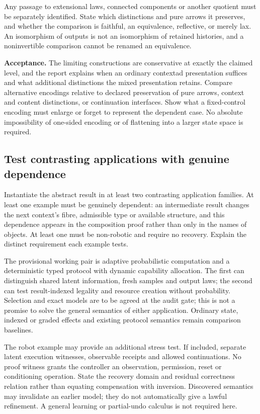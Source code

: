 \documentclass[11pt,a4paper]{article}
\begin{document}
Any passage to extensional laws, connected components or another quotient
must be separately identified. State which distinctions and pure arrows it
preserves, and whether the comparison is faithful, an equivalence, reflective,
or merely lax. An isomorphism of outputs is not an isomorphism of retained
histories, and a noninvertible comparison cannot be renamed an equivalence.

\textbf{Acceptance.} The limiting constructions are conservative at exactly
the claimed level, and the report explains when an ordinary contextad
presentation suffices and what additional distinctions the mixed presentation
retains. Compare alternative encodings relative to declared preservation of pure arrows,
context and content distinctions, or continuation interfaces. Show what a
fixed-control encoding must enlarge or forget to represent the dependent case.
No absolute impossibility of one-sided encoding or of flattening into a larger
state space is required.

\subsection{Test contrasting applications with genuine dependence}

Instantiate the abstract result in at least two contrasting application
families. At least one example must be genuinely dependent: an intermediate
result changes the next context's fibre, admissible type or available
structure, and this dependence appears in the composition proof rather than
only in the names of objects. At least one must be non-robotic and require no
recovery. Explain the distinct requirement each example tests.

The provisional working pair is adaptive probabilistic computation and a
deterministic typed protocol with dynamic capability allocation. The first
can distinguish shared latent information, fresh samples and output laws;
the second can test result-indexed legality and resource creation without
probability. Selection and exact models are to be agreed at the audit gate;
this is not a promise to solve the general semantics of either application.
Ordinary state, indexed or graded effects and existing protocol semantics
remain comparison baselines.

The robot example may provide an additional stress test. If included, separate
latent execution witnesses, observable receipts and allowed continuations.
No proof witness grants the controller an observation, permission, reset or
conditioning operation. State the recovery domain and residual correctness
relation rather than equating compensation with inversion. Discovered semantics
may invalidate an earlier model; they do not automatically give a lawful
refinement. A general learning or partial-undo calculus is not required here.
\end{document}
